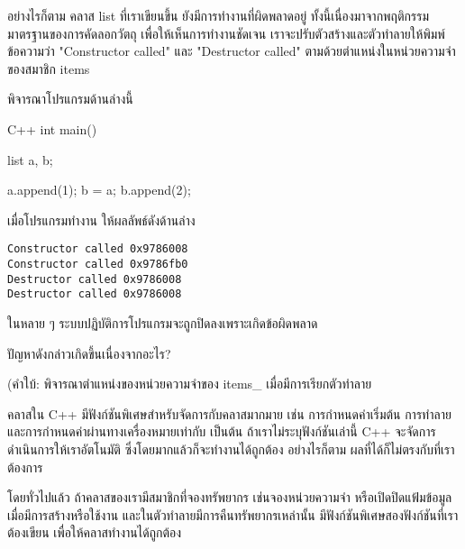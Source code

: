 อย่างไรก็ตาม ค{\wbr}ลา{\wbr}ส {\ct list} ที่{\wbr}เรา{\wbr}เขียน{\wbr}ขึ้น ยัง{\wbr}มี{\wbr}การ{\wbr}ทำงาน{\wbr}ที่{\wbr}ผิดพลาด{\wbr}อยู่{\wbr}
ทั้งนี้{\wbr}เนื่องมาจาก{\wbr}พฤติกรรม{\wbr}มาตรฐาน{\wbr}ของ{\wbr}การ{\wbr}คัดลอก{\wbr}วัตถุ เพื่อให้{\wbr}เห็น{\wbr}การ{\wbr}ทำงาน{\wbr}ชัดเจน{\wbr}
เรา{\wbr}จะ{\wbr}ปรับ{\wbr}ตัว{\wbr}สร้าง{\wbr}และ{\wbr}ตัว{\wbr}ทำลาย{\wbr}ให้{\wbr}พิมพ์{\wbr}ข้อความ{\wbr}ว่า {\ct "Constructor called"} และ{\wbr}
{\ct "Destructor called"} ตาม{\wbr}ด้วย{\wbr}ตำแหน่ง{\wbr}ใน{\wbr}หน่วยความจำ{\wbr}ของ{\wbr}สมาชิก {\ct items}

พิจารณา{\wbr}โปรแกรม{\wbr}ด้าน{\wbr}ล่าง{\wbr}นี้{\wbr}
\latintext
\begin{codelist}{C++}{}
int main()
{
  list a, b;

  a.append(1);
  b = a;
  b.append(2);
}
\end{codelist}
\thaitext

เมื่อ{\wbr}โปรแกรม{\wbr}ทำงาน ให้{\wbr}ผลลัพธ์{\wbr}ดัง{\wbr}ด้าน{\wbr}ล่าง{\wbr}
{\latintext
\begin{verbatim}
Constructor called 0x9786008
Constructor called 0x9786fb0
Destructor called 0x9786008
Destructor called 0x9786008
\end{verbatim}
}
ใน{\wbr}หลาย ๆ ระบบปฏิบัติการ{\wbr}โปรแกรม{\wbr}จะ{\wbr}ถูก{\wbr}ปิด{\wbr}ลง{\wbr}เพราะ{\wbr}เกิด{\wbr}ข้อผิดพลาด{\wbr}

\begin{quiz}{}
ปัญหา{\wbr}ดังกล่าว{\wbr}เกิด{\wbr}ขึ้น{\wbr}เนื่องจาก{\wbr}อะไร?

(คำ{\wbr}ใบ้: พิจารณา{\wbr}ตำแหน่ง{\wbr}ของ{\wbr}หน่วยความจำ{\wbr}ของ {\ct items\_} เมื่อ{\wbr}มี{\wbr}การ{\wbr}เรียก{\wbr}ตัว{\wbr}ทำลาย{\wbr}
\end{quiz}

ค{\wbr}ลา{\wbr}ส{\wbr}ใน C++ มี{\wbr}ฟังก์ชัน{\wbr}พิเศษ{\wbr}สำหรับ{\wbr}จัดการ{\wbr}กับ{\wbr}ค{\wbr}ลา{\wbr}ส{\wbr}มากมาย เช่น การ{\wbr}กำหนด{\wbr}ค่า{\wbr}เริ่มต้น การ{\wbr}ทำลาย{\wbr}
และ{\wbr}การ{\wbr}กำหนด{\wbr}ค่า{\wbr}ผ่าน{\wbr}ทาง{\wbr}เครื่องหมาย{\wbr}เท่า{\wbr}กับ เป็นต้น ถ้า{\wbr}เรา{\wbr}ไม่{\wbr}ระบุ{\wbr}ฟังก์ชัน{\wbr}เล่า{\wbr}นี้ C++
จะ{\wbr}จัดการ{\wbr}ดำเนินการ{\wbr}ให้{\wbr}เรา{\wbr}อัตโนมัติ ซึ่ง{\wbr}โดยมาก{\wbr}แล้ว{\wbr}ก็{\wbr}จะ{\wbr}ทำงาน{\wbr}ได้{\wbr}ถูกต้อง อย่างไรก็ตาม{\wbr}
ผล{\wbr}ที่{\wbr}ได้{\wbr}ก็{\wbr}ไม่{\wbr}ตรง{\wbr}กับ{\wbr}ที่{\wbr}เรา{\wbr}ต้องการ{\wbr}

โดย{\wbr}ทั่วไป{\wbr}แล้ว ถ้า{\wbr}ค{\wbr}ลา{\wbr}ส{\wbr}ของ{\wbr}เรา{\wbr}มี{\wbr}สมาชิก{\wbr}ที่{\wbr}จอง{\wbr}ทรัพยากร เช่น{\wbr}จอง{\wbr}หน่วยความจำ{\wbr}
หรือ{\wbr}เปิด{\wbr}ปิด{\wbr}แฟ้มข้อมูล เมื่อ{\wbr}มี{\wbr}การ{\wbr}สร้าง{\wbr}หรือ{\wbr}ใช้{\wbr}งาน และ{\wbr}ใน{\wbr}ตัว{\wbr}ทำลาย{\wbr}มี{\wbr}การ{\wbr}คืน{\wbr}ทรัพยากร{\wbr}เหล่านั้น{\wbr}
มี{\wbr}ฟังก์ชัน{\wbr}พิเศษ{\wbr}สอง{\wbr}ฟังก์ชัน{\wbr}ที่{\wbr}เรา{\wbr}ต้อง{\wbr}เขียน เพื่อให้{\wbr}ค{\wbr}ลา{\wbr}ส{\wbr}ทำงาน{\wbr}ได้{\wbr}ถูกต้อง{\wbr}

